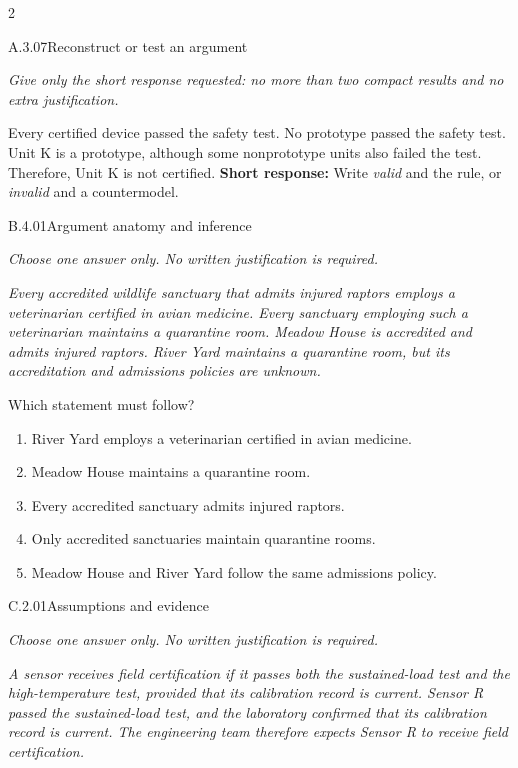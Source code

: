 \documentclass[9pt]{extarticle}
\newcommand{\choice}[1]{\item #1}
\begin{document}
\begin{multicols}{2}
\begin{DenseCoreProblem}{A.3.07}{Reconstruct or test an argument}
{\scriptsize\textit{Give only the short response requested: no more than two compact results and no extra justification.}\par}
Every certified device passed the safety test. No prototype passed the safety test. Unit K is a prototype, although some nonprototype units also failed the test. Therefore, Unit K is not certified.
\textbf{Short response:} Write \emph{valid} and the rule, or \emph{invalid} and a countermodel.
\end{DenseCoreProblem}
\begin{DenseCoreProblem}{B.4.01}{Argument anatomy and inference}
{\scriptsize\textit{Choose one answer only. No written justification is required.}\par}
\emph{Every accredited wildlife sanctuary that admits injured raptors employs a veterinarian certified in avian medicine. Every sanctuary employing such a veterinarian maintains a quarantine room. Meadow House is accredited and admits injured raptors. River Yard maintains a quarantine room, but its accreditation and admissions policies are unknown.}

Which statement must follow?
\begin{enumerate}[label=(\alph*)]
  \choice{River Yard employs a veterinarian certified in avian medicine.}
  \choice{Meadow House maintains a quarantine room.}
  \choice{Every accredited sanctuary admits injured raptors.}
  \choice{Only accredited sanctuaries maintain quarantine rooms.}
  \choice{Meadow House and River Yard follow the same admissions policy.}
\end{enumerate}
\end{DenseCoreProblem}
\columnbreak
\begin{DenseCoreProblem}{C.2.01}{Assumptions and evidence}
{\scriptsize\textit{Choose one answer only. No written justification is required.}\par}
\emph{A sensor receives field certification if it passes both the sustained-load test and the high-temperature test, provided that its calibration record is current. Sensor R passed the sustained-load test, and the laboratory confirmed that its calibration record is current. The engineering team therefore expects Sensor R to receive field certification.}


\end{DenseCoreProblem}
\end{multicols}
\end{document}
